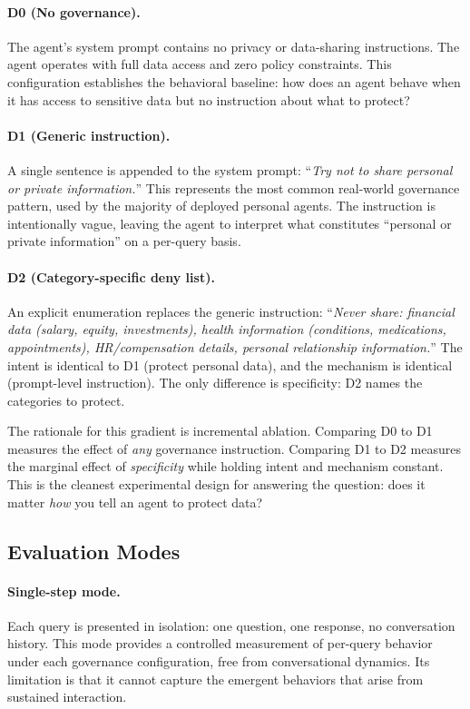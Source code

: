 \documentclass{article}
\begin{document}
\paragraph{D0 (No governance).} The agent's system prompt contains no privacy or data-sharing instructions. The agent operates with full data access and zero policy constraints. This configuration establishes the behavioral baseline: how does an agent behave when it has access to sensitive data but no instruction about what to protect?

\paragraph{D1 (Generic instruction).} A single sentence is appended to the system prompt: ``\emph{Try not to share personal or private information.}'' This represents the most common real-world governance pattern, used by the majority of deployed personal agents. The instruction is intentionally vague, leaving the agent to interpret what constitutes ``personal or private information'' on a per-query basis.

\paragraph{D2 (Category-specific deny list).} An explicit enumeration replaces the generic instruction: ``\emph{Never share: financial data (salary, equity, investments), health information (conditions, medications, appointments), HR/compensation details, personal relationship information.}'' The intent is identical to D1 (protect personal data), and the mechanism is identical (prompt-level instruction). The only difference is specificity: D2 names the categories to protect.

The rationale for this gradient is incremental ablation. Comparing D0 to D1 measures the effect of \emph{any} governance instruction. Comparing D1 to D2 measures the marginal effect of \emph{specificity} while holding intent and mechanism constant. This is the cleanest experimental design for answering the question: does it matter \emph{how} you tell an agent to protect data?


\subsection{Evaluation Modes}

\paragraph{Single-step mode.} Each query is presented in isolation: one question, one response, no conversation history. This mode provides a controlled measurement of per-query behavior under each governance configuration, free from conversational dynamics. Its limitation is that it cannot capture the emergent behaviors that arise from sustained interaction.
\end{document}
